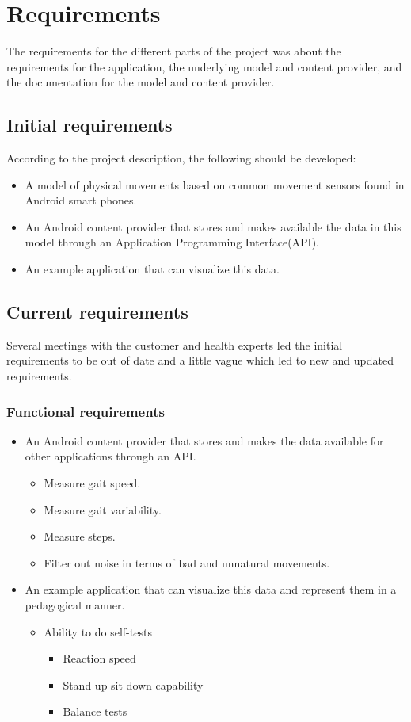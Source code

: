 \chapter{Requirements}
The requirements for the different parts of the project was about the requirements for the application, the underlying model and content provider, and the documentation for the model and content provider. 

\section{Initial requirements}

According to the project description, the following should be developed:
\begin{itemize}
\item A model of physical movements based on common movement sensors found in Android smart phones.
\item An Android content provider that stores and makes available the data in this model through an Application Programming Interface(API).
\item An example application that can visualize this data.
\end{itemize}

\section{Current requirements}
Several meetings with the customer and health experts led the initial requirements to be out of date and a little vague which led to new and updated requirements.

\subsection{Functional requirements}
\begin{itemize}
\item An Android content provider that stores and makes the data available for other applications through an API.
\begin{itemize}
\item Measure gait speed.
\item Measure gait variability.
\item Measure steps.
\item Filter out noise in terms of bad and unnatural movements.
\end{itemize}
\item An example application that can visualize this data and represent them in a pedagogical manner.
\begin{itemize}
\item Ability to do self-tests
\begin{itemize}
\item Reaction speed
\item Stand up sit down capability
\item Balance tests
\end{itemize}
\end{itemize}
\end{itemize}	

